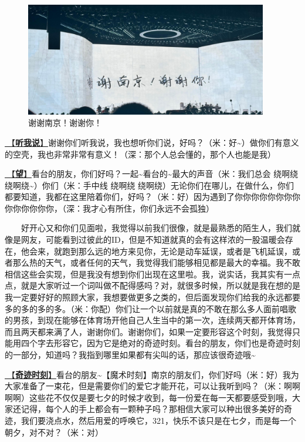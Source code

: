 \documentclass[]{ctexbook}
\begin{document}
\begin{figure}

{\centering \includegraphics[width=300pt]{img/nanjing20240811/thank-nanjing} 

}

\caption{谢谢南京！谢谢你！}\label{fig:unnamed-chunk-69}
\end{figure}

\hyperref[listen-to-me]{🎵【\textbf{听我说}】}谢谢你们听我说，我也想听你们说，好吗？（米：好\textasciitilde）做你们有意义的空壳，我也非常非常有意义！（深：那个人总会懂的，那个人也能是我）

\hyperref[hope]{🎵【\textbf{望}】}看台的朋友，你们好吗？一起\textasciitilde 看台的\textasciitilde 最大的声音（米：我们总会 绕啊绕 绕啊绕\textasciitilde）你们（米：手中线 绕啊绕 绕啊绕）无论你们在哪儿，在做什么，你们都要知道，我都在这里陪着你们，好吗？（米：好）因为遇到了你你你你你你你你你你你你你你，（深：我才心有所住，你们永远不会孤独）

  好开心又和你们见面啦，我觉得以前我们很像，就是最熟悉的陌生人，我们就像是网友，可能看到过彼此的ID，但是不知道就真的会有这样浓的一股温暖会存在，他会来，就跑到那么远的地方来见你，无论是动车延误，或者是飞机延误，或者那么热的天气，或者任何的天气，我觉得我们能够相见都是最大的幸福。我不敢相信这些会实现，但是我没有想到你们出现在这里啦。我，说实话，我其实有一点点，就是大家听过一个词叫做不配得感吗？对，就很多时候，所以就是我在想的是我一定要好好的照顾大家，我想要做更多之类的，但后面发现你们给我的永远都要多的多的多的多。（米：你配）你们让一个以前就是真的不敢在那么多人面前唱歌的男孩，到现在能够在体育场开他自己人生当中的第一次，连续两天都开体育场，而且两天都来满了人，谢谢你们。谢谢你们，如果一定要形容这个时刻，我觉得只能用四个字去形容它，因为它是绝对的奇迹时刻。看台的朋友，你们也是奇迹时刻的一部分，知道吗？我指到哪里如果都有尖叫的话，那应该很奇迹哦\textasciitilde{}

\hyperref[magic-moment]{🎵【\textbf{奇迹时刻}】}看台的朋友\textasciitilde【魔术时刻】南京的朋友们，你们好吗（米：好）我为大家准备了一束花，但是需要你们的爱它才能开花，可以让我听到吗？（米：啊啊啊啊）这些花不仅仅是要七夕的时候才收到，每一份爱在每一天都要感受到哦，大家还记得，每个人的手上都会有一颗种子吗？那相信大家可以种出很多美好的奇迹，我们要浇点水，然后用爱的呼唤它，321，快乐不该只是在七夕，而是每一个朝夕，对不对？（米：对）
\end{document}
